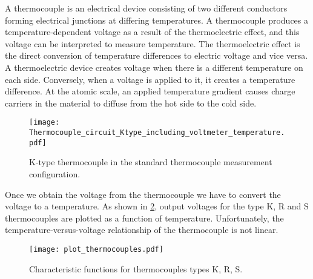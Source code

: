 A thermocouple is an electrical device consisting of two different conductors forming electrical junctions at differing temperatures. A thermocouple produces a temperature-dependent voltage as a result of the thermoelectric effect, and this voltage can be interpreted to measure temperature.
The thermoelectric effect is the direct conversion of temperature differences to electric voltage and vice versa. A thermoelectric device creates voltage when there is a different temperature on each side. Conversely, when a voltage is applied to it, it creates a temperature difference. At the atomic scale, an applied temperature gradient causes charge carriers in the material to diffuse from the hot side to the cold side.
\begin{figure}[!htp]
	\centering
	\texttt{[image: Thermocouple\_circuit\_Ktype\_including\_voltmeter\_temperature.pdf]}
	\caption{K-type thermocouple in the standard thermocouple measurement configuration.}
	\label{Fig:Thermocouple_circuit_Ktype_including_voltmeter_temperature}
\end{figure}

Once we obtain the voltage from the thermocouple we have to convert the voltage to a temperature.
As shown in \ref{Fig:plot_thermocouples}, output voltages for the type K, R and S thermocouples are plotted as a function of temperature.
Unfortunately, the temperature-versus-voltage relationship of the thermocouple is not linear.

\begin{figure}[htbp]
	\centering
	\texttt{[image: plot\_thermocouples.pdf]}
	\caption{Characteristic functions for thermocouples types K, R, S.}
	\label{Fig:plot_thermocouples}
\end{figure}

